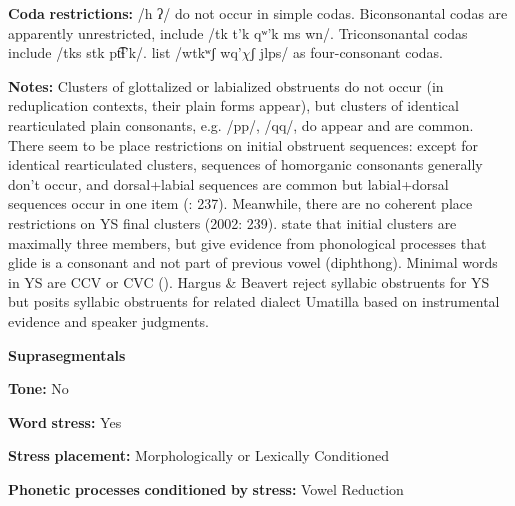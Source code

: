 \documentclass[output=paper]{langsci/langscibook}
\begin{document}
\begin{styleBody}
\textbf{Coda} \textbf{restrictions:} /h ʔ/ do not occur in simple codas. Biconsonantal codas are apparently unrestricted, include /tk t’k qʷ'k ms wn/. Triconsonantal codas include /tks stk pt͡ɬ’k/. \citet{HargusBeavert2006} list /wtkʷʃ wq’$\chi ʃ$ jlps/ as four-consonant codas.
\end{styleBody}

\begin{styleBody}
\textbf{Notes:} Clusters of glottalized or labialized obstruents do not occur (in reduplication contexts, their plain forms appear), but clusters of identical rearticulated plain consonants, e.g. /pp/, /qq/, do appear and are common. There seem to be place restrictions on initial obstruent sequences: except for identical rearticulated clusters, sequences of homorganic consonants generally don’t occur, and dorsal+labial sequences are common but labial+dorsal sequences occur in one item (\citealt{HargusBeavert2002}: 237). Meanwhile, there are no coherent place restrictions on YS final clusters (2002: 239). \citet{RigsbyRude1996} state that initial clusters are maximally three members, but \citet{HargusBeavert2006} give evidence from phonological processes that glide is a consonant and not part of previous vowel (diphthong). Minimal words in YS are CCV or CVC (\citealt{HargusBeavert2006}). Hargus \& Beavert reject syllabic obstruents for YS but \citet{Minthorn2005} posits syllabic obstruents for related dialect Umatilla based on instrumental evidence and speaker judgments.
\end{styleBody}

\begin{styleBody}
\textbf{Suprasegmentals}
\end{styleBody}

\begin{styleBody}
\textbf{Tone:} No
\end{styleBody}

\begin{styleBody}
\textbf{Word} \textbf{stress:} Yes
\end{styleBody}

\begin{styleBody}
\textbf{Stress} \textbf{placement:} Morphologically or Lexically Conditioned
\end{styleBody}

\begin{styleBody}
\textbf{Phonetic} \textbf{processes} \textbf{conditioned} \textbf{by} \textbf{stress:} Vowel Reduction
\end{styleBody}
\end{document}
